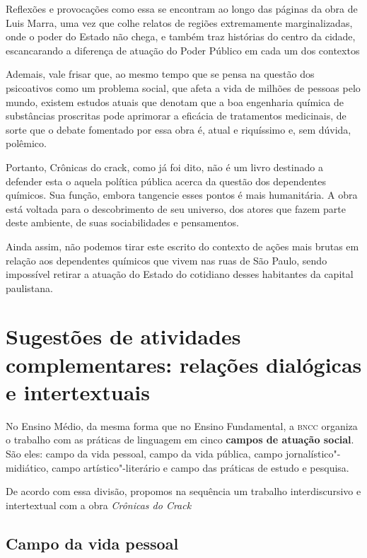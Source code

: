 \documentclass{article}
\begin{document}
Reflexões e provocações como essa se encontram ao longo das páginas da
obra de Luis Marra, uma vez que colhe relatos de regiões extremamente
marginalizadas, onde o poder do Estado não chega, e também traz
histórias do centro da cidade, escancarando a diferença de atuação do
Poder Público em cada um dos contextos

Ademais, vale frisar que, ao mesmo tempo que se pensa na questão dos
psicoativos como um problema social, que afeta a vida de milhões de
pessoas pelo mundo, existem estudos atuais que denotam que a boa
engenharia química de substâncias proscritas pode aprimorar a eficácia
de tratamentos medicinais, de sorte que o debate fomentado por essa obra
é, atual e riquíssimo e, sem dúvida, polêmico.

Portanto, Crônicas do crack, como já foi dito, não é um livro destinado
a defender esta o aquela política pública acerca da questão dos
dependentes químicos. Sua função, embora tangencie esses pontos é mais
humanitária. A obra está voltada para o descobrimento de seu universo,
dos atores que fazem parte deste ambiente, de suas sociabilidades e
pensamentos.

Ainda assim, não podemos tirar este escrito do contexto de ações mais
brutas em relação aos dependentes químicos que vivem nas ruas de São
Paulo, sendo impossível retirar a atuação do Estado do cotidiano desses
habitantes da capital paulistana.


\section{Sugestões de atividades complementares: relações dialógicas e
intertextuais}


No Ensino Médio, da mesma forma que no Ensino Fundamental, a \textsc{bncc}
organiza o trabalho com as práticas de linguagem em cinco \textbf{campos
de atuação social}. São eles: campo da vida pessoal, campo da vida
pública, campo jornalístico"-midiático, campo artístico"-literário e campo
das práticas de estudo e pesquisa.

De acordo com essa divisão, propomos na sequência um trabalho
interdiscursivo e intertextual com a obra \emph{Crônicas do Crack}

\subsection{Campo da vida pessoal}
\end{document}
